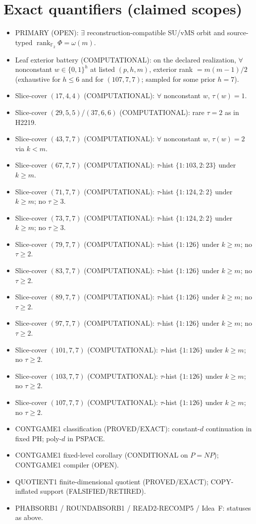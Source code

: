 \documentclass[11pt]{article}
\begin{document}
\section*{Exact quantifiers (claimed scopes)}
\begin{itemize}
\item PRIMARY (OPEN): $\exists$ reconstruction-compatible SU/vMS orbit and source-typed
  $\operatorname{rank}_{\mathbb F_2}\Phi=\omega(m)$.
\item Leaf exterior battery (COMPUTATIONAL): on the declared realization, $\forall$ nonconstant
  $w\in\{0,1\}^h$ at listed $(p,h,m)$, exterior rank $=m(m-1)/2$
  (exhaustive for $h\le6$ and for $(107,7,7)$; sampled for some prior $h{=}7$).
\item Slice-cover $(17,4,4)$ (COMPUTATIONAL): $\forall$ nonconstant $w$, $\tau(w)=1$.
\item Slice-cover $(29,5,5)$/$(37,6,6)$ (COMPUTATIONAL): rare $\tau{=}2$ as in H2219.
\item Slice-cover $(43,7,7)$ (COMPUTATIONAL): $\forall$ nonconstant $w$, $\tau(w)=2$ via $k{<}m$.
\item Slice-cover $(67,7,7)$ (COMPUTATIONAL): $\tau$-hist $\{1{:}103,2{:}23\}$ under $k{\ge}m$.
\item Slice-cover $(71,7,7)$ (COMPUTATIONAL): $\tau$-hist $\{1{:}124,2{:}2\}$ under $k{\ge}m$;
  no $\tau{\ge}3$.
\item Slice-cover $(73,7,7)$ (COMPUTATIONAL): $\tau$-hist $\{1{:}124,2{:}2\}$ under $k{\ge}m$;
  no $\tau{\ge}3$.
\item Slice-cover $(79,7,7)$ (COMPUTATIONAL): $\tau$-hist $\{1{:}126\}$ under $k{\ge}m$;
  no $\tau{\ge}2$.
\item Slice-cover $(83,7,7)$ (COMPUTATIONAL): $\tau$-hist $\{1{:}126\}$ under $k{\ge}m$;
  no $\tau{\ge}2$.
\item Slice-cover $(89,7,7)$ (COMPUTATIONAL): $\tau$-hist $\{1{:}126\}$ under $k{\ge}m$;
  no $\tau{\ge}2$.
\item Slice-cover $(97,7,7)$ (COMPUTATIONAL): $\tau$-hist $\{1{:}126\}$ under $k{\ge}m$;
  no $\tau{\ge}2$.
\item Slice-cover $(101,7,7)$ (COMPUTATIONAL): $\tau$-hist $\{1{:}126\}$ under $k{\ge}m$;
  no $\tau{\ge}2$.
\item Slice-cover $(103,7,7)$ (COMPUTATIONAL): $\tau$-hist $\{1{:}126\}$ under $k{\ge}m$;
  no $\tau{\ge}2$.
\item Slice-cover $(107,7,7)$ (COMPUTATIONAL): $\tau$-hist $\{1{:}126\}$ under $k{\ge}m$;
  no $\tau{\ge}2$.
\item CONTGAME1 classification (PROVED/EXACT): constant-$d$ continuation in fixed PH;
  poly-$d$ in PSPACE.
\item CONTGAME1 fixed-level corollary (CONDITIONAL on $P=NP$); CONTGAME1 compiler (OPEN).
\item QUOTIENT1 finite-dimensional quotient (PROVED/EXACT); COPY-inflated support (FALSIFIED/RETIRED).
\item PHABSORB1 / ROUNDABSORB1 / READ2-RECOMP5 / Idea~F: statuses as above.
\end{itemize}
\end{document}
